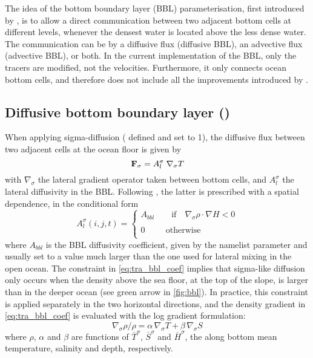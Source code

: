 \documentclass[../main/NEMO_manual]{subfiles}
\begin{document}
The idea of the bottom boundary layer (BBL) parameterisation, first introduced by \citet{Beckmann_Doscher1997},
is to allow a direct communication between two adjacent bottom cells at different levels,
whenever the densest water is located above the less dense water.
The communication can be by a diffusive flux (diffusive BBL), an advective flux (advective BBL), or both.
In the current implementation of the BBL, only the tracers are modified, not the velocities.
Furthermore, it only connects ocean bottom cells, and therefore does not include all the improvements introduced by
\citet{Campin_Goosse_Tel99}.

\subsection{Diffusive bottom boundary layer (\protect{})}
\label{subsec:TRA_bbl_diff}

When applying sigma-diffusion ( defined and  set to 1),
the diffusive flux between two adjacent cells at the ocean floor is given by 
\[
  {\rm {\bf F}}_\sigma=A_l^\sigma \; \nabla_\sigma T
\]
with $\nabla_\sigma$ the lateral gradient operator taken between bottom cells,
and  $A_l^\sigma$ the lateral diffusivity in the BBL.
Following \citet{Beckmann_Doscher1997}, the latter is prescribed with a spatial dependence,
\ie in the conditional form
\begin{equation}
  \label{eq:tra_bbl_coef}
  A_l^\sigma (i,j,t)=\left\{ {
      \begin{array}{l}
        A_{bbl}  \quad \quad   \mbox{if}  \quad   \nabla_\sigma \rho  \cdot  \nabla H<0 \\ \\
        0\quad \quad \;\,\mbox{otherwise} \\
      \end{array}}
  \right.
\end{equation} 
where $A_{bbl}$ is the BBL diffusivity coefficient, given by the namelist parameter  and
usually set to a value much larger than the one used for lateral mixing in the open ocean.
The constraint in \autoref{eq:tra_bbl_coef} implies that sigma-like diffusion only occurs when
the density above the sea floor, at the top of the slope, is larger than in the deeper ocean
(see green arrow in \autoref{fig:bbl}).
In practice, this constraint is applied separately in the two horizontal directions,
and the density gradient in \autoref{eq:tra_bbl_coef} is evaluated with the log gradient formulation: 
\[
  \nabla_\sigma \rho / \rho = \alpha \,\nabla_\sigma T + \beta   \,\nabla_\sigma S
\]
where $\rho$, $\alpha$ and $\beta$ are functions of $\overline{T}^\sigma$,
$\overline{S}^\sigma$ and $\overline{H}^\sigma$, the along bottom mean temperature, salinity and depth, respectively.
\end{document}

